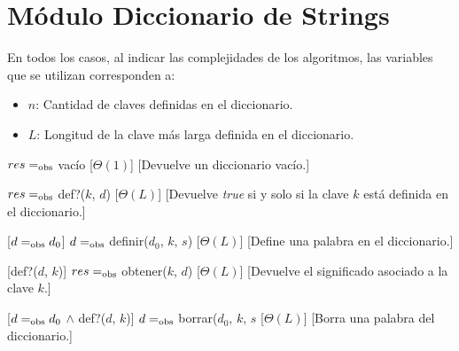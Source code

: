 \section{M\'{o}dulo Diccionario de Strings}

  En todos los casos, al indicar las complejidades de los algoritmos, las variables que se utilizan corresponden a:
  \vspace{-0.5em}\begin{itemize}
    \item $n$: Cantidad de claves definidas en el diccionario.
    \item $L$: Longitud de la clave m\'as larga definida en el diccionario.
  \end{itemize}

\begin{Interfaz}
  
  \begin{paramFormales}
    \paramGeneros{$\alpha$}

    

  \end{paramFormales}




    {$res =_{\mathrm{obs}}$ vac\'{i}o}%
    [$\Theta(1)$]%
    [Devuelve un diccionario vac\'io.]

    {$res =_{\mathrm{obs}}$ def?($k$, $d$)}%
    [$\Theta(L)$]%
    [Devuelve \emph{true} si y solo si la clave $k$ est\'a definida en el diccionario.]

    [$d =_{\mathrm{obs}} d_{0}$]%
    {$d =_{\mathrm{obs}}$ definir($d_{0}$, $k$, $s$)}%
    [$\Theta(L)$]%
    [Define una palabra en el diccionario.]

    [def?($d$, $k$)]%
    {$res =_{\mathrm{obs}}$ obtener($k$, $d$)}%
    [$\Theta(L)$]%
    [Devuelve el significado asociado a la clave $k$.]

    [$d =_{\mathrm{obs}} d_{0}$ $\land$ def?($d$, $k$)]%
    {$d =_{\mathrm{obs}}$ borrar($d_{0}$, $k$, $s$}%
    [$\Theta(L)$]%
    [Borra una palabra del diccionario.]

\end{Interfaz}
